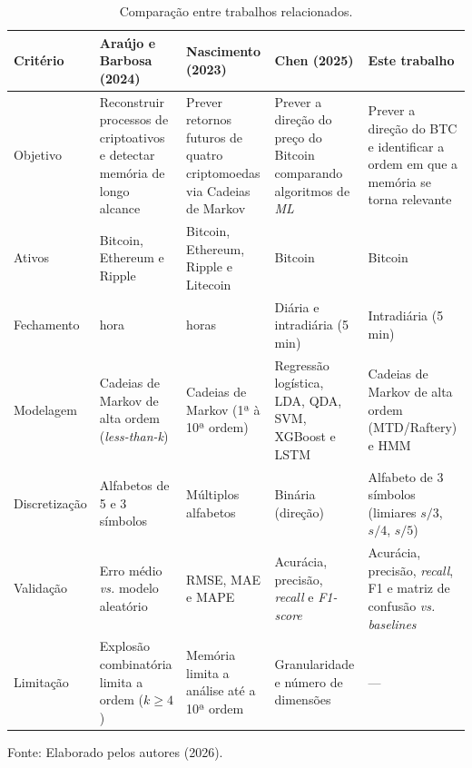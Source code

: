 \documentclass[
    12pt,                %
    openright,           %
    oneside,             %
    a4paper,             %
    english,             %
    brazil               %
]{abntex2}
\begin{document}
\begin{table}[htb]
    \centering
    \caption{Comparação entre trabalhos relacionados.}
    \label{tab:tabela_um}
    \footnotesize
    \renewcommand{\arraystretch}{1.25}
    \setlength{\tabcolsep}{4pt}
        \begin{tabularx}{\textwidth}{%
            >{\raggedright\arraybackslash}p{1.7cm}%
            >{\raggedright\arraybackslash}X%
            >{\raggedright\arraybackslash}X%
            >{\raggedright\arraybackslash}X%
            >{\raggedright\arraybackslash}X}
        \toprule
        \textbf{Critério} & \textbf{Araújo e Barbosa (2024)} & \textbf{Nascimento (2023)} & \textbf{Chen (2025)} & \textbf{Este trabalho} \\
        \midrule
        Objetivo & Reconstruir processos de criptoativos e detectar memória de longo alcance & Prever retornos futuros de quatro criptomoedas via Cadeias de Markov & Prever a direção do preço do Bitcoin comparando algoritmos de \textit{ML} & Prever a direção do BTC e identificar a ordem em que a memória se torna relevante \\
        \addlinespace
        Ativos & Bitcoin, Ethereum e Ripple & Bitcoin, Ethereum, Ripple e Litecoin & Bitcoin & Bitcoin \\
        \addlinespace
        Fechamento   & 1 hora & 24 horas & Diária e intradiária (5 min) & Intradiária (5 min) \\
        \addlinespace
        Modelagem & Cadeias de Markov de alta ordem (\textit{less-than-k}) & Cadeias de Markov (1ª à 10ª ordem) & Regressão logística, LDA, QDA, SVM, XGBoost e LSTM & Cadeias de Markov de alta ordem (MTD/Raftery) e HMM \\
        \addlinespace
        Discretização & Alfabetos de 5 e 3 símbolos & Múltiplos alfabetos & Binária (direção) & Alfabeto de 3 símbolos (limiares $s/3$, $s/4$, $s/5$) \\
        \addlinespace
        Validação & Erro médio \textit{vs.} modelo aleatório & RMSE, MAE e MAPE & Acurácia, precisão, \textit{recall} e \textit{F1-score} & Acurácia, precisão, \textit{recall}, F1 e matriz de confusão \textit{vs.} \textit{baselines} \\
        \addlinespace
        Limitação & Explosão combinatória limita a ordem ($k \geq 4$) & Memória limita a análise até a 10ª ordem & Granularidade e número de dimensões & --- \\
        \bottomrule
        \end{tabularx}
    \par\vspace{2pt}
    \footnotesize Fonte: Elaborado pelos autores (2026).
\end{table}
\end{document}
